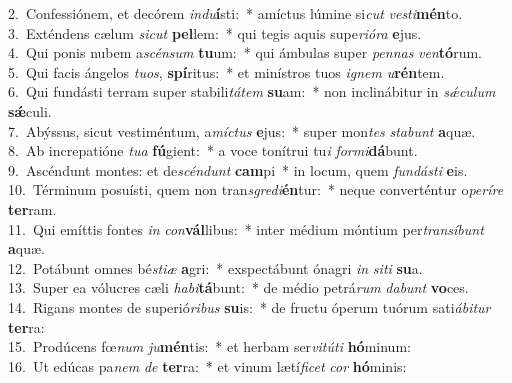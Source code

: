 {2.~}Confessiónem, et decórem \textit{in}\textit{du}\textbf{í}sti:~* amíctus lúmine si\textit{cut} \textit{ve}\textit{sti}\textbf{mén}to.\\
{3.~}Exténdens cælum \textit{si}\textit{cut} \textbf{pel}lem:~* qui tegis aquis supe\textit{ri}\textit{ó}\textit{ra} \textbf{e}jus.\\
{4.~}Qui ponis nubem a\textit{scén}\textit{sum} \textbf{tu}um:~* qui ámbulas super \textit{pen}\textit{nas} \textit{ven}\textbf{tó}rum.\\
{5.~}Qui facis ángelos \textit{tu}\textit{os}, \textbf{spí}ritus:~* et minístros tuos \textit{i}\textit{gnem} \textit{u}\textbf{rén}tem.\\
{6.~}Qui fundásti terram super stabili\textit{tá}\textit{tem} \textbf{su}am:~* non inclinábitur in \textit{sǽ}\textit{cu}\textit{lum} \textbf{sǽ}culi.\\
{7.~}Abýssus, sicut vestiméntum, a\textit{mí}\textit{ctus} \textbf{e}jus:~* super mon\textit{tes} \textit{sta}\textit{bunt} \textbf{a}quæ.\\
{8.~}Ab increpatióne \textit{tu}\textit{a} \textbf{fú}gient:~* a voce tonítrui tu\textit{i} \textit{for}\textit{mi}\textbf{dá}bunt.\\
{9.~}Ascéndunt montes: et de\textit{scén}\textit{dunt} \textbf{cam}pi~* in locum, quem \textit{fun}\textit{dá}\textit{sti} \textbf{e}is.\\
{10.~}Términum posuísti, quem non tran\textit{sgre}\textit{di}\textbf{én}tur:~* neque converténtur o\textit{pe}\textit{rí}\textit{re} \textbf{ter}ram.\\
{11.~}Qui emíttis fontes \textit{in} \textit{con}\textbf{vál}libus:~* inter médium móntium per\textit{tran}\textit{sí}\textit{bunt} \textbf{a}quæ.\\
{12.~}Potábunt omnes bé\textit{sti}\textit{æ} \textbf{a}gri:~* exspectábunt ónagri \textit{in} \textit{si}\textit{ti} \textbf{su}a.\\
{13.~}Super ea vólucres cæli \textit{ha}\textit{bi}\textbf{tá}bunt:~* de médio petrá\textit{rum} \textit{da}\textit{bunt} \textbf{vo}ces.\\
{14.~}Rigans montes de superió\textit{ri}\textit{bus} \textbf{su}is:~* de fructu óperum tuórum sati\textit{á}\textit{bi}\textit{tur} \textbf{ter}ra:\\
{15.~}Prodúcens fœ\textit{num} \textit{ju}\textbf{mén}tis:~* et herbam ser\textit{vi}\textit{tú}\textit{ti} \textbf{hó}minum:\\
{16.~}Ut edúcas pa\textit{nem} \textit{de} \textbf{ter}ra:~* et vinum lætí\textit{fi}\textit{cet} \textit{cor} \textbf{hó}minis:\\
